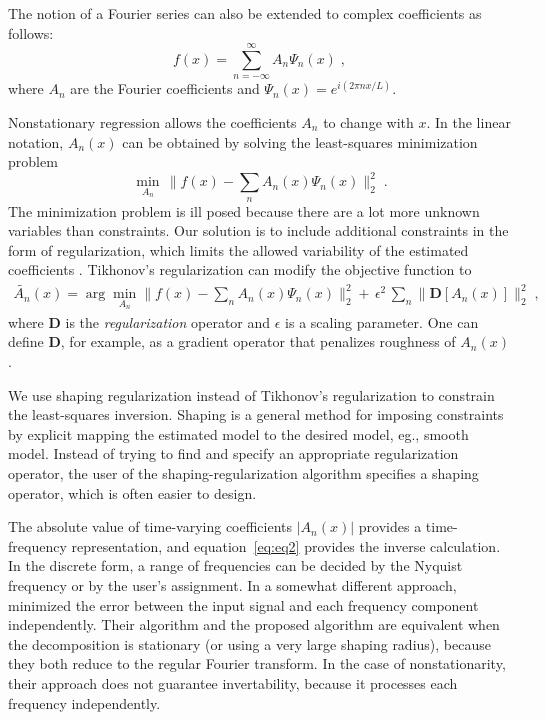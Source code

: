 The notion of a Fourier series can also be extended to complex
coefficients as follows:
\begin{equation}
  \label{eq:eq2}
  f(x) = \sum_{n=-\infty}^{\infty}A_n \Psi_n(x)\;,
\end{equation}
where $A_n$ are the Fourier coefficients and $\Psi_n (x) = e^{i(2\pi
nx/L)}$. 

Nonstationary regression allows the coefficients $A_n$ to change with
$x$. In the linear notation, $A_n(x)$ can be obtained by solving the
least-squares minimization problem
\begin{equation}
  \label{eq:eq3}
  \min_{A_n}\,\|f(x)-\sum_n A_n(x) \Psi_n(x) \|_2^2\;.
\end{equation}
The minimization problem 
is ill posed because there are a lot more unknown variables than
constraints. Our solution is to include additional constraints in the
form of regularization, which limits the allowed variability of the
estimated coefficients
\cite[]{Fomel09}. Tikhonov's regularization \cite[]{Tikhonov63} can
modify the objective function to
\begin{eqnarray}
  \label{eq:eq4}
  \widetilde{A_n}(x) = \arg\min_{A_n}\|f(x)-\sum_n 
            A_n(x)\Psi_n(x)\|_2^2
             +\, \epsilon^2\, \sum_n \|\mathbf{D}[A_n(x)]\|_2^2\;,
\end{eqnarray}%
where $\mathbf{D}$ is the \emph{regularization} operator and
$\epsilon$ is a scaling parameter. One can define $\mathbf{D}$,
for example, as a
gradient operator that penalizes roughness of $A_n(x)$.

We use shaping regularization \cite[]{Fomel07b} 
instead of Tikhonov's regularization to constrain the 
least-squares inversion. Shaping is a general method for imposing
constraints by explicit mapping the estimated model to
the desired model, eg., smooth
model. Instead of trying to find
and specify an appropriate regularization operator, the user of the
shaping-regularization algorithm specifies a shaping operator, which
is often easier to design.

The absolute value of time-varying coefficients $|A_n(x)|$ provides a
time-frequency representation, and equation~\ref{eq:eq2} provides the
inverse calculation. In the discrete form,
a range of frequencies can be decided by the Nyquist frequency
\cite[]{Cohen95} or by the user's assignment. In a somewhat different
approach, \cite{Liu09} minimized the error between the input signal
and each frequency component independently. Their algorithm and the
proposed algorithm are equivalent when the decomposition is stationary
(or using a very large shaping radius), because they both reduce to
the regular Fourier transform. In the case of nonstationarity, their
approach does not guarantee invertability, because it processes each
frequency independently.

